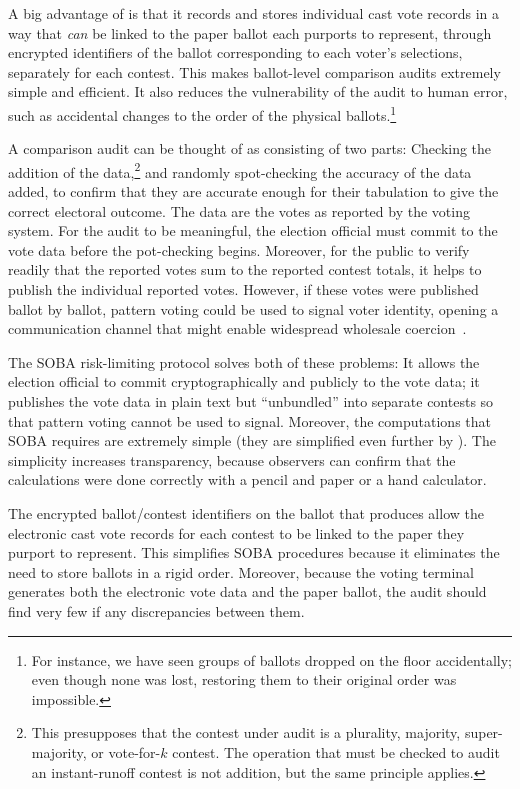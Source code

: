 A big advantage of \projname is that it records and stores individual cast vote records in a way that 
{\em can\/} be linked to
the paper ballot each purports to represent, through encrypted identifiers
of the ballot corresponding to each voter's selections, separately for each contest.
This makes ballot-level comparison audits extremely simple and efficient.
It also reduces the vulnerability of the audit to human error, such as accidental changes to the order
of the physical ballots.\footnote{%
   For instance, we have seen groups of ballots dropped on the floor accidentally;
   even though none was lost, restoring them to their original order was impossible.
}

A comparison audit can be thought of as consisting of two parts:
Checking the addition of the data,\footnote{%
   This presupposes that the contest under audit is a plurality, majority, super-majority, or vote-for-$k$
   contest.
   The operation that must be checked to audit an instant-runoff contest is not addition, but the
   same principle applies.
}
and randomly spot-checking the accuracy of the data added, to confirm that they are accurate
enough for their tabulation to give the correct electoral outcome.
The data are the votes as reported by the voting system.
For the audit to be meaningful, the election official must commit to the vote data before the
pot-checking begins.
Moreover, for the public to verify readily that the reported votes sum to the reported contest totals,
it helps to publish the individual reported votes.
However, if these votes were published ballot by ballot, pattern voting could be used to signal voter identity,
opening a communication channel that might enable 
widespread wholesale coercion~\cite{rescorla09,benalohEtal11}.

The SOBA risk-limiting protocol \cite{benalohEtal11} solves both of these problems:
It allows the election official to commit cryptographically and publicly to the vote data; it publishes
the vote data in plain text but ``unbundled'' into separate contests so that pattern voting cannot
be used to signal.
Moreover, the computations that SOBA requires are extremely simple (they are simplified
even further by \cite{lindemanStark12}).
The simplicity increases transparency, because observers can confirm that the calculations
were done correctly with a pencil and paper or a hand calculator.

The encrypted ballot/contest identifiers on the ballot that \projname produces 
allow the electronic cast vote records for each contest to be linked to
the paper they purport to represent.
This simplifies SOBA procedures because it eliminates the need to store ballots in a rigid order.
Moreover, because the voting terminal generates both the electronic vote data and the paper ballot, 
the audit should find very few if any discrepancies between them.

